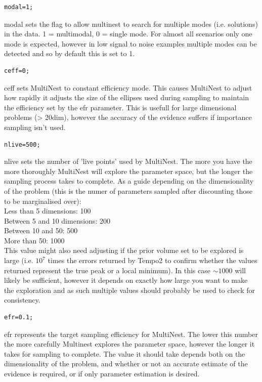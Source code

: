 \documentclass[%
 preprint,
 amsmath,amssymb,amsfonts,
 aps,
]{revtex4-1}
\begin{document}
\begin{lstlisting}
modal=1;
\end{lstlisting}     
modal sets the flag to allow multinest to search for multiple modes (i.e. solutions) in the data. 1 = multimodal, 0 = single mode.  For almost all scenarios only one mode is expected, however in low signal to noise examples multiple modes can be detected and so by default this is set to 1.
   
\begin{lstlisting}
ceff=0;
\end{lstlisting}  

ceff sets MultiNest to constant efficiency mode.  This causes MultiNest to adjust how rapidly it adjusts the size of the ellipses used during sampling to maintain the efficiency set by the efr parameter. This is usefull for large dimensional problems (> 20dim), however the accuracy of the evidence suffers if importance sampling isn't used.

\begin{lstlisting}
nlive=500;
\end{lstlisting}  

nlive sets the number of 'live points' used by MultiNest.  The more you have the more thoroughly MultiNest will explore the parameter space, but the longer the sampling process takes to complete.
As a guide depending on the dimensionality of the problem (this is the numer of parameters sampled after discounting those to be marginalised over): \\
%
Less than 5 dimensions: 100\\
Between 5 and 10 dimensions: 200\\
Between 10 and 50: 500\\
More than 50: 1000\\

This value might also need adjusting if the prior volume set to be explored is large (i.e. $10^7$ times the errors returned by Tempo2 to confirm whether the values returned represent the true peak or a local minimum).  In this case $\sim 1000$ will likely be sufficient, however it depends on exactly how large you want to make the exploration and as such multiple values should probably be used to check for consistency.

\begin{lstlisting}
efr=0.1;
\end{lstlisting}  

efr represents the target sampling efficiency for MultiNest.  The lower this number the more carefully Multinest explores the parameter space, however the longer it takes for sampling to complete.
The value it should take depends both on the dimensionality of the problem, and whether or not an accurate estimate of the evidence is required, or if only parameter estimation is desired.
\end{document}
